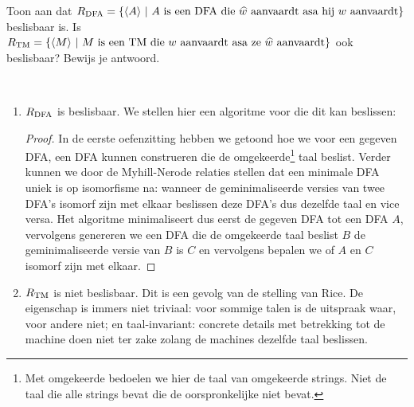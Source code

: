 \documentclass[a4paper]{article}
\begin{document}
\begin{question}
Toon aan dat $R_{\rm DFA} = \{ \langle A \rangle \ | \ \text{$A$ is een DFA die $\widehat{w}$ aanvaardt asa hij $w$ aanvaardt} \}$ beslisbaar is. Is $R_{\rm TM} = \{ \langle M \rangle \ | \ \text{$M$ is een TM die $w$ aanvaardt asa ze $\widehat{w}$ aanvaardt} \}$ ook beslisbaar? Bewijs je antwoord.
\begin{answer}~~
\begin{enumerate}
  \item $R_{\rm DFA}$ is beslisbaar. We stellen hier een algoritme voor die dit kan beslissen:
  \begin{proof}
  In de eerste oefenzitting hebben we getoond hoe we voor een gegeven DFA, een DFA kunnen construeren die de omgekeerde\footnote{Met omgekeerde bedoelen we hier de taal van omgekeerde strings. Niet de taal die alle strings bevat die de oorspronkelijke niet bevat.} taal beslist. Verder kunnen we door de Myhill-Nerode relaties stellen dat een minimale DFA uniek is op isomorfisme na: wanneer de geminimaliseerde versies van twee DFA's isomorf zijn met elkaar beslissen deze DFA's dus dezelfde taal en vice versa. Het algoritme minimaliseert dus eerst de gegeven DFA tot een DFA $A$, vervolgens genereren we een DFA die de omgekeerde taal beslist $B$ de geminimaliseerde versie van $B$ is $C$ en vervolgens bepalen we of $A$ en $C$ isomorf zijn met elkaar.
  \end{proof}
  \item $R_{\rm TM}$ is niet beslisbaar. Dit is een gevolg van de stelling van Rice. De eigenschap is immers niet triviaal: voor sommige talen is de uitspraak waar, voor andere niet; en taal-invariant: concrete details met betrekking tot de machine doen niet ter zake zolang de machines dezelfde taal beslissen.
\end{enumerate}

\end{answer}
\end{question}
\end{document}
